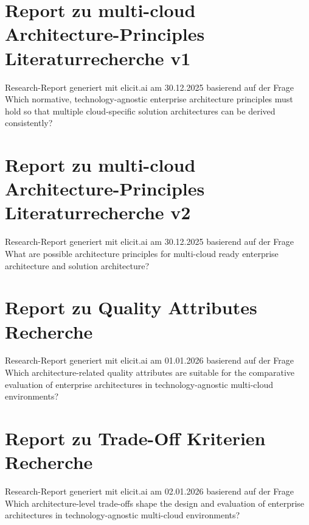 \begin{appendix}
\section{Report zu multi-cloud Architecture-Principles Literaturrecherche v1}
\label{appendix:architecture-principles-v1}
Research-Report generiert mit elicit.ai am 30.12.2025 basierend auf der Frage \flqq Which normative, technology-agnostic enterprise architecture principles must
hold so that multiple cloud-specific solution architectures can be derived consistently?\frqq


\section{Report zu multi-cloud Architecture-Principles Literaturrecherche v2}
\label{appendix:architecture-principles-v2}
Research-Report generiert mit elicit.ai am 30.12.2025 basierend auf der Frage \flqq What are possible architecture principles for multi-cloud ready enterprise architecture and solution architecture?\frqq


\section{Report zu Quality Attributes Recherche}
\label{appendix:quality-attributes-research}
Research-Report generiert mit elicit.ai am 01.01.2026 basierend auf der Frage \flqq Which architecture-related quality attributes are suitable for the comparative
evaluation of enterprise architectures in technology-agnostic multi-cloud environments? \frqq


\section{Report zu Trade-Off Kriterien Recherche}
\label{appendix:trade-off-criteria-reserach}
Research-Report generiert mit elicit.ai am 02.01.2026 basierend auf der Frage \flqq Which architecture-level trade-offs shape the design and evaluation of enterprise
architectures in technology-agnostic multi-cloud environments? \frqq



% 

\end{appendix}